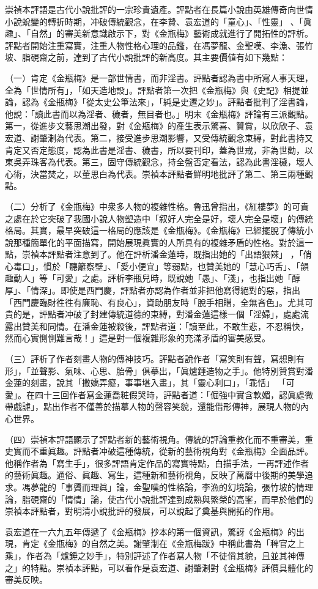 崇禎本評語是古代小說批評的一宗珍貴遺產。評點者在長篇小說由英雄傳奇向世情小說蛻變的轉折時期，冲破傳統觀念，在李贄、袁宏道的「童心」、「性靈」 、「眞趣」、「自然」的審美新意識啟示下，對《金瓶梅》藝術成就進行了開拓性的評析。評點者開始注重寫實，注重人物性格心理的品鑑，在馮夢龍、金聖嘆、李漁、張竹坡、脂硯齋之前，達到了古代小說批評的新高度。其主要價値有如下幾點：

（一）肯定《金瓶梅》是一部世情書，而非淫書。評點者認為書中所寫人事天理，全為「世情所有」，「如天造地設」。評點者第一次把《金瓶梅》與《史記》相提並論，認為《金瓶梅》「從太史公筆法來」，「純是史遷之妙」。評點者批判了淫書論，他說：「讀此書而以為淫者、穢者，無目者也。」明末《金瓶梅》評論有三派觀點。第一，從進步文藝思潮出發，對《金瓶梅》的產生表示驚喜、贊賞，以欣欣子、袁宏道、謝肇淛為代表。第二，接受進步思潮影響，又受傳統觀念束縛，對此書持又肯定又否定態度，認為此書是淫書、穢書，所以要刊印，蓋為世戒，非為世勸，以東吳弄珠客為代表。第三，固守傳統觀念，持全盤否定看法，認為此書淫穢，壞人心術，決當焚之，以董思白為代表。崇禎本評點者鮮明地批評了第二、第三兩種觀點。

（二）分析了《金瓶梅》中衆多人物的複雜性格。魯迅曾指出，《紅樓夢》的可貴之處在於它突破了我國小說人物塑造中「叙好人完全是好，壞人完全是壞」的傳統格局。其實，最早突破這一格局的應該是《金瓶梅》。《金瓶梅》已經擺脫了傳統小說那種簡單化的平面描寫，開始展現眞實的人所具有的複雜矛盾的性格。對於這一點，崇禎本評點者注意到了。他在評析潘金蓮時，既指出她的「出語狠辣」 ，「俏心毒口」，慣於「聽籬察壁」、「愛小便宜」等弱點，也贊美她的「慧心巧舌」、「韻趣動人」等「可愛」之處。評析李瓶兒時，既說她「愚」、「淺」，也指出她「醇厚」、「情深」。即使是西門慶，評點者亦認為作者並非把他寫得絕對的惡，指出「西門慶臨財徃徃有廉恥、有良心」，資助朋友時「脫手相贈，全無吝色」。尤其可貴的是，評點者冲破了封建傳統道德的束縛，對潘金蓮這樣一個「淫婦」，處處流露出贊美和同情。在潘金蓮被殺後，評點者道：「讀至此，不敢生悲，不忍稱快，然而心實惻惻難言哉！」這是對一個複雜形象的充滿矛盾的審美感受。

（三）評析了作者刻畫人物的傳神技巧。評點者說作者「寫笑則有聲，寫想則有形」，「並聲影、氣味、心思、胎骨」俱摹出，「眞爐錘造物之手」。他特別贊賞對潘金蓮的刻畫，說其「撒嬌弄癡，事事堪入畫」，其「靈心利口」，「乖恬」 「可愛」。在四十三回作者寫金蓮喬粧假哭時，評點者道：「倔強中實含軟媚，認眞處微帶戲謔」，點出作者不僅善於描摹人物的聲容笑貌，還能借形傳神，展現人物的內心世界。

（四）崇禎本評語顯示了評點者新的藝術視角。傳統的評論重教化而不重審美，重史實而不重眞趣。評點者冲破這種傳統，從新的藝術視角對《金瓶梅》全面品評。他稱作者為「寫生手」，很多評語肯定作品的寫實特點，白描手法，一再評述作者的藝術眞趣。通俗、眞趣、寫生，這種新和藝術視角，反映了萬曆中後期的美學追求。馮夢龍的「事贗而理眞」論，金聖嘆的性格論，李漁的幻境論，張竹坡的情理論，脂硯齋的「情情」論，使古代小說批評達到成熟與繁榮的高峯，而早於他們的崇禎本評點者，對明清小說批評的發展，可以說起了奠基與開拓的作用。

袁宏道在一六九五年傳遞了《金瓶梅》抄本的第一個資訊，驚訝《金瓶梅》的出現，肯定《金瓶梅》的自然之美。謝肇淛在《金瓶梅跋》中稱此書為「稗官之上乘」，作者為「爐錘之妙手」，特別評述了作者寫人物「不徒俏其貌，且並其神傳之」的特點。崇禎本評點，可以看作是袁宏道、謝肇淛對《金瓶梅》評價具體化的審美反映。


